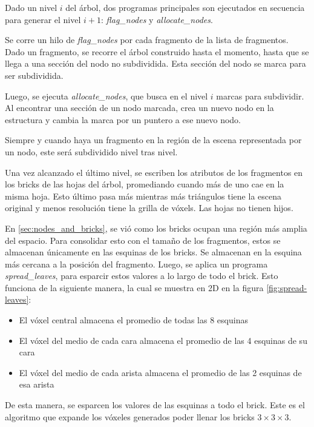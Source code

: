 Dado un nivel $i$ del árbol, dos programas principales son ejecutados en secuencia para generar el nivel $i + 1$: \textit{flag\_nodes} y \textit{allocate\_nodes}.

Se corre un hilo de \textit{flag\_nodes} por cada fragmento de la lista de fragmentos.
Dado un fragmento, se recorre el árbol construido hasta el momento, hasta que se llega a una sección del nodo no subdividida.
Esta sección del nodo se marca para ser subdividida.

Luego, se ejecuta \textit{allocate\_nodes}, que busca en el nivel $i$ marcas para subdividir.
Al encontrar una sección de un nodo marcada, crea un nuevo nodo en la estructura y cambia la marca por un puntero a ese nuevo nodo.

Siempre y cuando haya un fragmento en la región de la escena representada por un nodo, este será subdividido nivel tras nivel.

Una vez alcanzado el último nivel, se escriben los atributos de los fragmentos en los bricks de las hojas del árbol, promediando cuando más de uno cae en la misma hoja.
Esto último pasa más mientras más triángulos tiene la escena original y menos resolución tiene la grilla de vóxels.
Las hojas no tienen hijos.

En \ref{sec:nodes_and_bricks}, se vió como los bricks ocupan una región más amplia del espacio.
Para consolidar esto con el tamaño de los fragmentos, estos se almacenan únicamente en las esquinas de los bricks.
Se almacenan en la esquina más cercana a la posición del fragmento.
Luego, se aplica un programa \textit{spread\_leaves}, para esparcir estos valores a lo largo de todo el brick.
Esto funciona de la siguiente manera, la cual se muestra en 2D en la figura \ref{fig:spread-leaves}:
\begin{itemize}
    \item El vóxel central almacena el promedio de todas las 8 esquinas
    \item El vóxel del medio de cada cara almacena el promedio de las 4 esquinas de su cara
    \item El vóxel del medio de cada arista almacena el promedio de las 2 esquinas de esa arista
\end{itemize}
De esta manera, se esparcen los valores de las esquinas a todo el brick.
Este es el algoritmo que expande los vóxeles generados poder llenar los bricks $3\times3\times3$.

